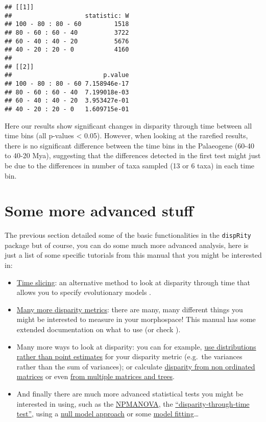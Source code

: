 \documentclass[
]{book}
\providecommand{\tightlist}{%
  \setlength{\itemsep}{0pt}\setlength{\parskip}{0pt}}
\begin{document}
\begin{verbatim}
## [[1]]
##                    statistic: W
## 100 - 80 : 80 - 60         1518
## 80 - 60 : 60 - 40          3722
## 60 - 40 : 40 - 20          5676
## 40 - 20 : 20 - 0           4160
## 
## [[2]]
##                         p.value
## 100 - 80 : 80 - 60 7.158946e-17
## 80 - 60 : 60 - 40  7.199018e-03
## 60 - 40 : 40 - 20  3.953427e-01
## 40 - 20 : 20 - 0   1.609715e-01
\end{verbatim}

Here our results show significant changes in disparity through time between all time bins (all p-values \textless{} 0.05).
However, when looking at the rarefied results, there is no significant difference between the time bins in the Palaeogene (60-40 to 40-20 Mya), suggesting that the differences detected in the first test might just be due to the differences in number of taxa sampled (13 or 6 taxa) in each time bin.

\hypertarget{some-more-advanced-stuff}{%
\section{Some more advanced stuff}\label{some-more-advanced-stuff}}

The previous section detailed some of the basic functionalities in the \texttt{dispRity} package but of course, you can do some much more advanced analysis, here is just a list of some specific tutorials from this manual that you might be interested in:

\begin{itemize}
\tightlist
\item
  \protect\hyperlink{time-slicing}{Time slicing}: an alternative method to look at disparity through time that allows you to specify evolutionary models \citep{time-slice}.
\item
  \protect\hyperlink{disparity-metrics}{Many more disparity metrics}: there are many, many different things you might be interested to measure in your morphospace! This manual has some extended documentation on what to use (or check \citet{moms}).
\item
  Many more ways to look at disparity: you can for example, \protect\hyperlink{disparity-distribution}{use distributions rather than point estimates} for your disparity metric (e.g.~the variances rather than the sum of variances); or calculate \protect\hyperlink{other-matrices}{disparity from non ordinated matrices} or even \protect\hyperlink{multi.input}{from multiple matrices and trees}.
\item
  And finally there are much more advanced statistical tests you might be interested in using, such as the \protect\hyperlink{adonis}{NPMANOVA}, the \protect\hyperlink{dtt}{``disparity-through-time test''}, using a \protect\hyperlink{null-test}{null model approach} or some \protect\hyperlink{model-fitting}{model fitting}\ldots{}
\end{itemize}
\end{document}

